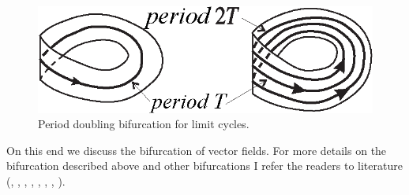 \begin{enumerate}
	\begin{figure}[!ht]
		\centering
		\includegraphics [scale=1.4]{jtr319}
		\caption{Period doubling bifurcation for limit cycles.}
		\label{fig:3.19}
	\end{figure}
\end{enumerate}

On this end we discuss the bifurcation of vector fields. For more details on the bifurcation described above and other bifurcations I refer the readers to literature (\cite{ALG1}, \cite{ALG2}, \cite{Ar2}, \cite{ArPl},
\cite{BaLe}, \cite{BNF}, \cite{GuHo}, \cite{MaMc}).
